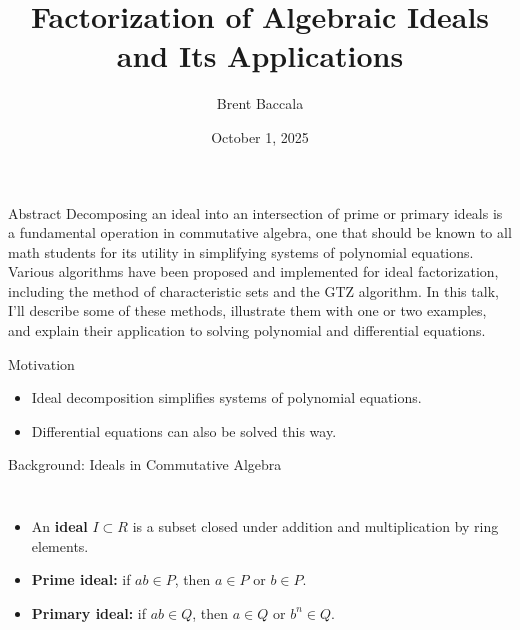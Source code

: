\documentclass[11pt]{beamer}
\title[Factorization of Ideals]{Factorization of Algebraic Ideals and Its Applications}
\author{Brent Baccala}
\institute{\tt cosine@freesoft.org}
\date{October 1, 2025}
\begin{document}
\begin{frame}
  \titlepage
\begin{block}{Abstract}
\tiny
Decomposing an ideal into an intersection of prime or primary ideals is a fundamental operation in commutative algebra, one that should be known to all math students for its utility in simplifying systems of polynomial equations.  Various algorithms have been proposed and implemented for ideal factorization, including the method of characteristic sets and the GTZ algorithm.  In this talk, I'll describe some of these methods, illustrate them with one or two examples, and explain their application to solving polynomial and differential equations.
\end{block}

\end{frame}

\begin{frame}{Motivation}
\begin{itemize}
  \item Ideal decomposition simplifies systems of polynomial equations.
  \item Differential equations can also be solved this way.
\end{itemize}
\end{frame}

\begin{frame}{Background: Ideals in Commutative Algebra}
\begin{columns}
\begin{itemize}
  \item An \textbf{ideal} $I \subset R$ is a subset closed under addition and multiplication by ring elements.
  \item \textbf{Prime ideal:} if $ab \in P$, then $a \in P$ or $b \in P$.
  \item \textbf{Primary ideal:} if $ab \in Q$, then $a \in Q$ or $b^n \in Q$.
\end{itemize}
\centering
{}
\end{columns}
\end{frame}
\end{document}
